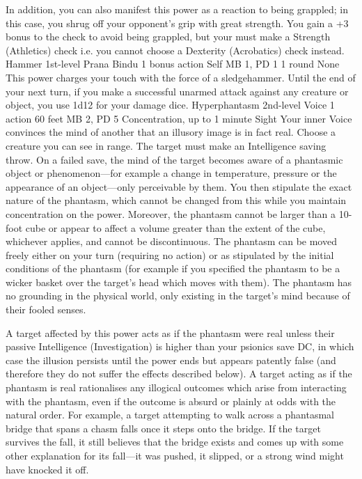 In addition, you can also manifest this power as a reaction
to being grappled; in this case, you shrug off your opponent's
grip with great strength. You gain a +3 bonus to the check
to avoid being grappled, but your must make a
Strength (Athletics) check
i.e. you cannot choose a Dexterity (Acrobatics) check instead.
\DndPowerHeader%
    {Hammer\label{pwr:hammer}}
    {1st-level Prana Bindu}
    {1 bonus action}
    {Self}
    {MB 1, PD 1}
    {1 round}
    {None}
This power charges your touch with the force
of a sledgehammer. Until the end of your next turn, if you
make a successful unarmed attack against any creature or object,
you use 1d12 for your damage dice.
\DndPowerHeader%
    {Hyperphantasm\label{pwr:hyperphantasm}}
    {2nd-level Voice}
    {1 action}
    {60 feet}
    {MB 2, PD 5}
    {Concentration, up to 1 minute}
    {Sight}
Your inner Voice convinces the mind of another that an illusory image
is in fact real. Choose a creature you can see in range.
The target must make an Intelligence saving throw.
On a failed save, the mind of the target becomes aware of a phantasmic
object or phenomenon---for example a change in temperature, pressure
or the appearance of an object---only perceivable by them.
You then stipulate the exact nature of the phantasm,
which cannot be changed from this while you maintain concentration
on the power. Moreover, the phantasm cannot be larger than a 10-foot cube
or appear to affect a volume greater than the extent of the cube,
whichever applies, and cannot be discontinuous.
The phantasm can be moved freely either on your turn (requiring no action)
or as stipulated by the initial conditions of the phantasm
(for example if you specified the phantasm to be a wicker basket
over the target's head which moves with them).
The phantasm has no grounding in the physical world,
only existing in the target's mind because of their fooled senses.

A target affected by this power acts as if the phantasm were real
unless their passive Intelligence (Investigation) is higher
than your psionics save DC,
in which case the illusion persists until the power ends
but appears patently false
(and therefore they do not suffer the effects described below).
A target acting as if the phantasm is real rationalises any illogical
outcomes which arise from interacting with the phantasm,
even if the outcome is absurd or plainly at odds with the natural order.
For example, a target attempting to walk across a phantasmal bridge
that spans a chasm falls once it steps onto the bridge.
If the target survives the fall, it still believes that the bridge exists
and comes up with some other explanation for its fall---it was pushed,
it slipped, or a strong wind might have knocked it off.

